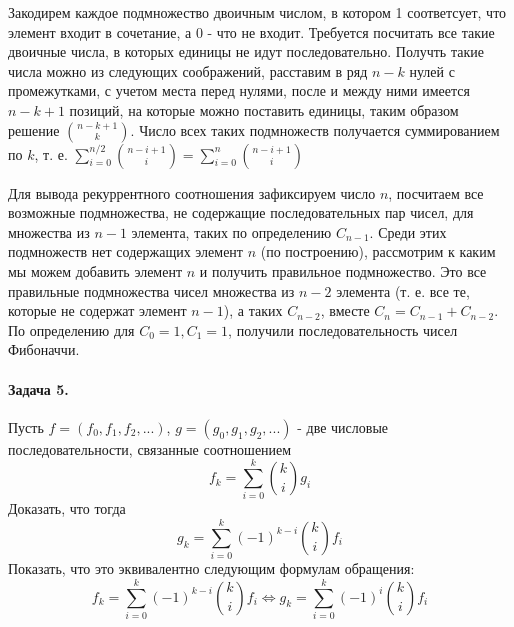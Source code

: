 \documentclass[a4paper,12pt]{article}
\begin{document}
\begin{Solution}
Закодирем каждое подмножество двоичным числом, в котором 1 соответсует, что элемент входит в сочетание, а 0 - что не входит. Требуется посчитать все такие двоичные числа, в которых единицы не идут последовательно. Получть такие числа можно из следующих соображений, расставим в ряд $n-k$ нулей с промежутками, с учетом места перед нулями, после и между ними имеется $n-k+1$ позиций, на которые можно поставить единицы, таким образом решение $\binom{n-k+1}{k}$. Число всех таких подмножеств получается суммированием по $k$, т. е. $\sum_{i=0}^{n/2}\binom{n-i+1}{i} = \sum_{i=0}^n \binom{n-i+1}{i}$

Для вывода рекуррентного соотношения зафиксируем число $n$, посчитаем все возможные подмножества, не содержащие последовательных пар чисел, для множества из $n-1$ элемента, таких по определению $C_{n-1}$. Среди этих подмножеств нет содержащих элемент $n$ (по построению), рассмотрим к каким мы можем добавить элемент $n$ и получить правильное подмножество. Это все правильные подмножества чисел множества из $n-2$ элемента (т. е. все те, которые не содержат элемент $n-1$), а таких $C_{n-2}$, вместе $C_n = C_{n-1}+C_{n-2}$. По определению для $C_0 = 1, C_1 = 1$, получили последовательность чисел Фибоначчи.
\end{Solution}

\paragraph{Задача 5.} Пусть $f=\left(f_0,f_1,f_2,...\right)$, $g=\left(g_0,g_1,g_2,...\right)$ - две числовые последовательности, связанные соотношением
\[
	f_k = \sum_{i=0}^k \binom{k}{i} g_i
\]
Доказать, что тогда
\[
	g_k = \sum_{i=0}^k {\left(-1\right)}^{k-i}\binom{k}{i} f_i
\]
Показать, что это эквивалентно следующим формулам обращения:
\[
	f_k = \sum_{i=0}^k {\left(-1\right)}^{k-i} \binom{k}{i}f_i \Leftrightarrow g_k = \sum_{i=0}^k {\left(-1\right)}^i \binom{k}{i}f_i
\]
\end{document}
